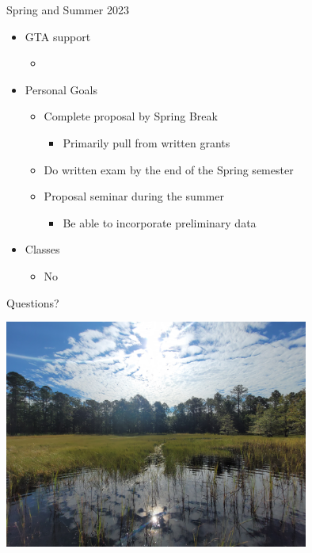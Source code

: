 \documentclass[10pt,aspectratio=169]{beamer}
\begin{document}
\begin{frame}{Spring and Summer 2023}
  \begin{itemize}
    \item GTA support
    \begin{itemize}
      \item 
    \end{itemize}
    \item Personal Goals
    \begin{itemize}
      \item Complete proposal by Spring Break
      \begin{itemize}
        \item Primarily pull from written grants
      \end{itemize}
      \item Do written exam by the end of the Spring semester
      \item Proposal seminar during the summer
      \begin{itemize}
        \item Be able to incorporate preliminary data
      \end{itemize}
    \end{itemize}
    \item Classes
    \begin{itemize}
      \item No
    \end{itemize}
  \end{itemize}

\end{frame}

\begin{frame}{Questions?}
  \begin{center}
    \includegraphics[height = 7.5cm]{media/conecuh-pond.jpg}    
  \end{center}

\end{frame}
\end{document}
